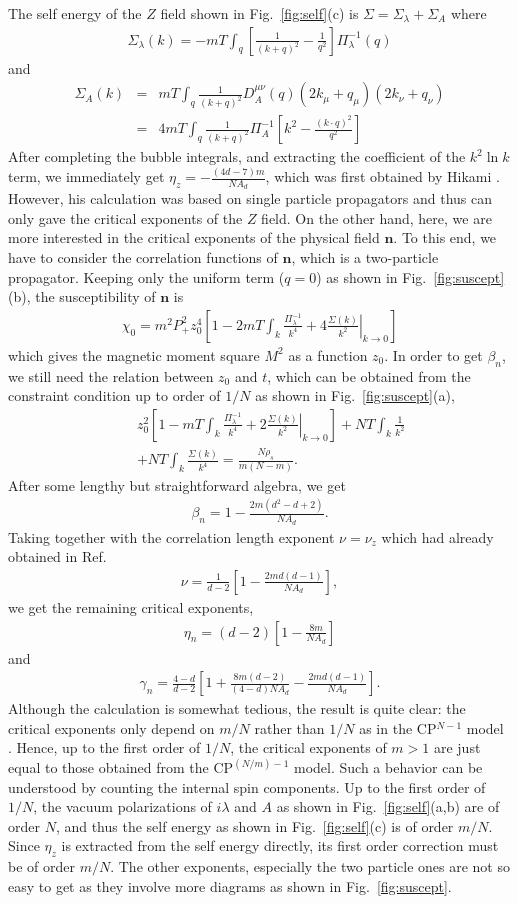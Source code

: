 \documentclass[aps,twocolumn,superscriptaddress]{revtex4-1}
\newcommand{\bea}{\begin{eqnarray}}
\newcommand{\eea}{\end{eqnarray}}
\newcommand{\bn}{\mathbf{n}}
\begin{document}
The self energy of the $Z$ field shown in Fig.~\ref{fig:self}(c) is $\Sigma=\Sigma_\lambda+\Sigma_A$ where \bea
\Sigma_\lambda(k)=-mT\int_q \left[\frac{1}{(k+q)^2}-\frac{1}{q^2}\right]\Pi_\lambda^{-1}(q) \eea and \bea \Sigma_A(k)
&=& mT\int_q \frac{1}{(k+q)^2} D_A^{\mu\nu}(q) (2k_\mu+q_\mu) (2k_\nu+q_\nu) \nonumber \\&=& 4mT\int_q
\frac{1}{(k+q)^2}\Pi_A^{-1}\left[ k^2-\frac{(k\cdot q)^2}{q^2} \right] \eea After completing the bubble integrals, and
extracting the coefficient of the $k^2\ln k$ term, we immediately get $\eta_z=-\frac{(4d-7)m}{NA_d}$, which was first obtained by
Hikami \cite{hikami1980}. However, his calculation was based on single particle propagators and thus can only gave the
critical exponents of the $Z$ field. On the other hand, here, we are more interested in the critical exponents of the
physical field $\bn$. To this end, we have to consider the correlation functions of $\bn$, which is a two-particle
propagator. Keeping only the uniform term ($q=0$) as shown in Fig.~\ref{fig:suscept}(b), the susceptibility of $\bn$ is
\bea \chi_0=m^2P_+^2 z_0^4\left[ 1-  2mT\int_k \frac{\Pi_\lambda^{-1}}{k^4} + 4
\left.\frac{\Sigma(k)}{k^2}\right|_{k\rightarrow0} \right] \eea which gives the magnetic moment square $M^2$ as a
function $z_0$. In order to get $\beta_n$, we still need the relation between $z_0$ and $t$, which can be obtained
from the constraint condition up to order of $1/N$ as shown in Fig.~\ref{fig:suscept}(a), \bea &&z_0^2 \left[ 1-
mT\int_k \frac{\Pi_\lambda^{-1}}{k^4} + 2 \left.\frac{\Sigma(k)}{k^2}\right|_{k\rightarrow0}\right] + NT\int_k
\frac{1}{k^2} \nonumber\\&&+ NT\int_k \frac{\Sigma(k)}{k^4} = \frac{N\rho_s}{m(N-m)}. \eea After some lengthy
but straightforward algebra, we get \bea \beta_n=1-\frac{2m(d^2-d+2)}{NA_d}. \eea Taking together with the
correlation length exponent $\nu=\nu_z$ which had already obtained in Ref.~\cite{hikami1980} \bea
\nu=\frac{1}{d-2}\left[ 1-\frac{2md(d-1)}{NA_d} \right], \eea we get the remaining critical exponents, \bea
\eta_n=(d-2)\left[1-\frac{8m}{NA_d}\right] \eea and \bea \gamma_n=\frac{4-d}{d-2}\left[
1+\frac{8m(d-2)}{(4-d)NA_d}-\frac{2md(d-1)}{NA_d} \right]. \eea Although the calculation is somewhat tedious, the
result is quite clear: the critical exponents only depend on $m/N$ rather than $1/N$ as in the
CP$^{N-1}$ model \cite{irkhin1996}. Hence, up to the first order of $1/N$, the critical exponents of $m>1$ are just
equal to those obtained from the CP$^{(N/m)-1}$ model. Such a behavior can be understood by counting the internal spin components. Up to the first order of $1/N$, the vacuum polarizations of $i\lambda$ and $A$ as shown in Fig.~\ref{fig:self}(a,b) are of order $N$, and thus the self energy as shown in Fig.~\ref{fig:self}(c) is of order $m/N$. Since $\eta_z$ is extracted from the self energy directly, its first order correction must be of order $m/N$. The other exponents, especially the two particle ones are not so easy to get as they involve more diagrams as shown in Fig.~\ref{fig:suscept}.
\end{document}

